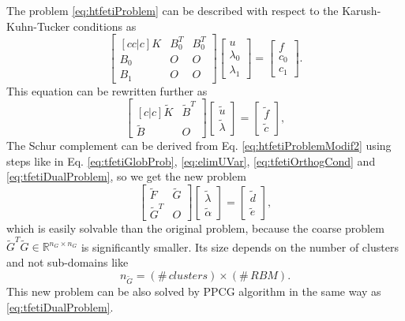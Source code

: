 The problem \eqref{eq:htfetiProblem} can be described with respect to the Karush-Kuhn-Tucker conditions as
\begin{equation}
\begin{bmatrix}[cc|c]
K & B_0^T & B_0^T \\
B_0 & O & O \\ \hline
B_1 & O & O
\end{bmatrix}
\begin{bmatrix}
u\\
\lambda_0\\ \hline
\lambda_1
\end{bmatrix}
=
\begin{bmatrix}
f\\
c_0\\ \hline
c_1
\end{bmatrix}.
\label{eq:htfetiProblemModif1}
\end{equation}
This equation can be rewritten further as
\begin{equation}
\begin{bmatrix}[c|c]
\tilde{K} & \tilde{B}^T\\ \hline
\tilde{B} & O
\end{bmatrix}
\begin{bmatrix}
\tilde{u}\\
\tilde{\lambda}
\end{bmatrix}
=
\begin{bmatrix}
\tilde{f}\\
\tilde{c}
\end{bmatrix},
\label{eq:htfetiProblemModif2}
\end{equation}
The Schur complement can be derived from Eq. 
\eqref{eq:htfetiProblemModif2} using steps like in 
Eq. \eqref{eq:tfetiGlobProb}, \eqref{eq:elimUVar}, 
\eqref{eq:tfetiOrthogCond} and 
\eqref{eq:tfetiDualProblem}, so we get the new 
problem
\begin{equation}
\left[
\begin{array}{lr}
\tilde{F} & \tilde{G} \\
\tilde{G}^T & O
\end{array}
\right]
\begin{bmatrix}
\tilde{\lambda}\\
\tilde{\alpha}
\end{bmatrix}
=
\begin{bmatrix}
\tilde{d}\\
\tilde{e}
\end{bmatrix},
\label{eq:htfetiDualProblem}
\end{equation}
which is easily solvable than the original problem, because the coarse problem $\tilde{G}^T\tilde{G} \in \mathbb{R}^{n_G \times n_G}$ is significantly smaller. Its size depends on the number of clusters and not sub-domains like
\begin{equation}
n_{\tilde{G}} = \left(\# \, clusters\right) \times \left(\# \, RBM \right).
\end{equation}
This new problem can be also solved by PPCG algorithm in the same way as \eqref{eq:tfetiDualProblem}.
